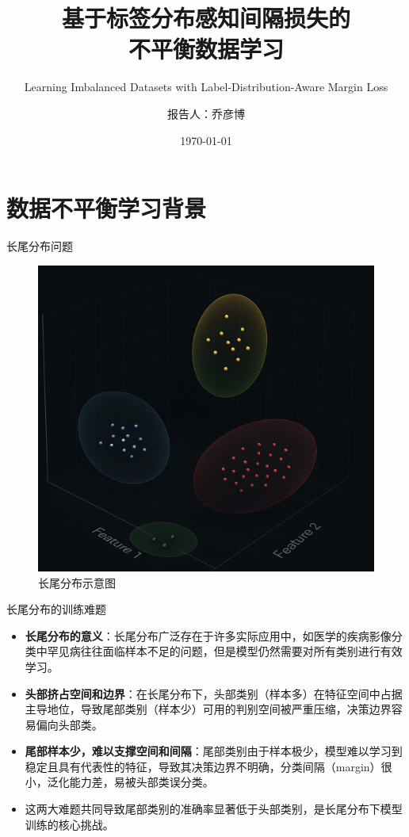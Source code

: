 \documentclass{beamer}
\title{基于标签分布感知间隔损失的\\不平衡数据学习}
\subtitle{Learning Imbalanced Datasets with Label-Distribution-Aware Margin Loss}
\author{报告人：乔彦博}
\institute{LDAM损失函数margin的推导证明}
\date{\today}
\begin{document}
\begin{frame}
    \titlepage
\end{frame}

\begin{frame}
\vspace{1em}
\begin{flushleft}
    \tableofcontents
\end{flushleft}
\end{frame}

\section{数据不平衡学习背景}
\begin{frame}{长尾分布问题}
    \begin{figure}[h]
        \centering
        \includegraphics[width=0.7\linewidth]{long-tail.png}
        \caption{长尾分布示意图}
    \end{figure}
\end{frame}
\begin{frame}{长尾分布的训练难题}
    \begin{itemize}
        \item \textbf{长尾分布的意义}：长尾分布广泛存在于许多实际应用中，如医学的疾病影像分类中罕见病往往面临样本不足的问题，但是模型仍然需要对所有类别进行有效学习。
        \item \textbf{头部挤占空间和边界}：在长尾分布下，头部类别（样本多）在特征空间中占据主导地位，导致尾部类别（样本少）可用的判别空间被严重压缩，决策边界容易偏向头部类。
        \item \textbf{尾部样本少，难以支撑空间和间隔}：尾部类别由于样本极少，模型难以学习到稳定且具有代表性的特征，导致其决策边界不明确，分类间隔（margin）很小，泛化能力差，易被头部类误分类。
        \item 这两大难题共同导致尾部类别的准确率显著低于头部类别，是长尾分布下模型训练的核心挑战。
    \end{itemize}
\end{frame}
\end{document}
